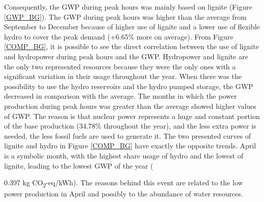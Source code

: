 Consequently, the GWP during peak hours was mainly based on lignite (Figure \ref{GWP_BG}). The GWP during peak hours was higher than the average from September to December because of higher use of lignite and a lower use of flexible hydro to cover the peak demand {(+6.65\% more on average)}. From Figure  \ref{COMP_BG}, it is possible to see the direct correlation between the use of lignite and hydropower during peak hours and the GWP. Hydropower and lignite are the only two represented resources because they were the only ones with a significant variation in their usage throughout the year. When there was the possibility to use the hydro reservoirs and the hydro pumped storage, the GWP decreased in comparison with the average. The months in which the power production during peak hours was greater than the average showed higher values of GWP. The reason is that  nuclear power represents a huge and constant portion of the base production {(34.78\% throughout the year)}, and the less extra power is needed, the less fossil fuels are used to generate it. The two presented curves of lignite and hydro in Figure \ref{COMP_BG} have exactly the opposite trends. April is a symbolic month, with the highest share usage of hydro and the lowest of lignite,  leading to the lowest GWP of the year ({0.397 kg CO\textsubscript2-eq/kWh). The reasons behind this event are related to the low power production in April and possibly to the abundance of water resources. 
 
}
